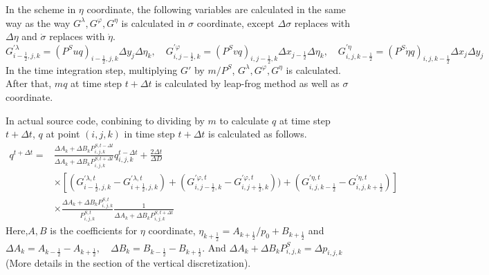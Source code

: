 \documentclass{article}
\begin{document}
In the scheme in $\eta$ coordinate, the following variables are calculated in the same way as the way $G^{\lambda}, G^{\varphi}, G^{\eta}$ is calculated in $\sigma$ coordinate, except $\Delta \sigma$ replaces with $\Delta \eta$ and $\dot{\sigma}$ replaces with $\dot{\eta}$. 
\begin{equation}
  G^{\prime \lambda}_{i-\frac{1}{2},j,k}=(P^{S}uq)_{i-\frac{1}{2},j,k} \Delta y_{j} \Delta \eta_{k},\quad G^{\prime \varphi}_{i,j-\frac{1}{2},k}=(P^{S}vq)_{i,j-\frac{1}{2},k} \Delta x_{j-\frac{1}{2}} \Delta \eta_{k},\quad G^{\prime \eta}_{i,j,k-\frac{1}{2}}=(P^{S} \dot{\eta} q)_{i,j,k-\frac{1}{2}} \Delta x_{j} \Delta y_{j}
\end{equation}
In the time integration step, multiplying $G\prime$ by $m/P^{S}$, $G^{\lambda}, G^{\varphi}, G^{\eta}$ is calculated.
After that, $mq$ at time step $t+\Delta t$ is calculated by leap-frog method as well as $\sigma$ coordinate.

In actual source code, conbining to dividing by $m$ to calculate $q$ at time step $t+\Delta t$, $q$ at point $(i,j,k)$ in time step $t+\Delta t$ is calculated as follows. 
\begin{equation}
  \begin{split}
        q^{t+\Delta t}=&\frac{\Delta A_{k}+\Delta B_{k} P^{S,t-\Delta t}_{i,j,k}}{\Delta A_{k}+\Delta B_{k} P^{S,t+\Delta t}_{i,j,k}}q^{t-\Delta t}_{i,j,k}+\frac{2\Delta t}{\Delta D}\\
    &\times [(G^{\prime \lambda,t}_{i-\frac{1}{2},j,k}-G^{\prime \lambda,t}_{i+\frac{1}{2},j,k})+(G^{\prime \varphi,t}_{i,j-\frac{1}{2},k}-G^{\prime \varphi,t}_{i,j+\frac{1}{2},k}))+(G^{\prime \eta,t}_{i,j,k-\frac{1}{2}}-G^{\prime \eta,t}_{i,j,k+\frac{1}{2}})]\\
    &\times \frac{\Delta A_{k}+\Delta B_{k} P^{S,t}_{i,j,k}}{P^{S,t}_{i,j,k}}\frac{1}{\Delta A_{k}+\Delta B_{k} P^{S,t+\Delta t}_{i,j,k}}
  \end{split}
\end{equation}
Here,$A,B$ is the coefficients for $\eta$ coordinate, $\eta_{k+\frac{1}{2}}=A_{k+\frac{1}{2}}/p_{0}+B_{k+\frac{1}{2}}$ and $\Delta A_{k}=A_{k-\frac{1}{2}}-A_{k+\frac{1}{2}},\quad \Delta B_{k}=B_{k-\frac{1}{2}}-B_{k+\frac{1}{2}}$.
And $\Delta A_{k}+\Delta B_{k} P^{S}_{i,j,k}=\Delta p_{i,j,k}$(More details in the section of the vertical discretization).
\end{document}
